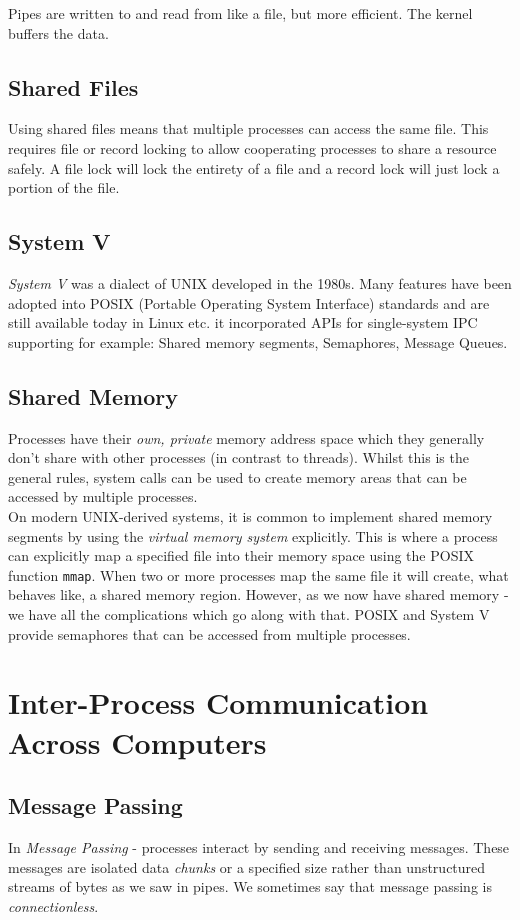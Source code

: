 Pipes are written to and read from like a file, but more efficient. The kernel buffers the data.

\subsection{Shared Files}
Using shared files means that multiple processes can access the same file. This requires file or record locking to allow cooperating processes to share a resource safely. A file lock will lock the entirety of a file and a record lock will just lock a portion of the file.

\subsection{System V}
\textit{System V} was a dialect of UNIX developed in the 1980s. Many features have been adopted into POSIX (Portable Operating System Interface) standards and are still available today in Linux etc. it incorporated APIs for single-system IPC supporting for example: Shared memory segments, Semaphores, Message Queues.

\subsection{Shared Memory}
Processes have their \textit{own, private} memory address space which they generally don't share with other processes (in contrast to threads). Whilst this is the general rules, system calls can be used to create memory areas that can be accessed by multiple processes.\\

On modern UNIX-derived systems, it is common to implement shared memory segments by using the \textit{virtual memory system} explicitly. This is where a process can explicitly map a specified file into their memory space using the POSIX function \verb|mmap|. When two or more processes map the same file it will create, what behaves like, a shared memory region. However, as we now have shared memory - we have all the complications which go along with that. POSIX and System V provide semaphores that can be accessed from multiple processes. 

\section{Inter-Process Communication Across Computers}
\subsection{Message Passing}
In \textit{Message Passing} - processes interact by sending and receiving messages. These messages are isolated data \textit{chunks} or a specified size rather than unstructured streams of bytes as we saw in pipes. We sometimes say that message passing is \textit{connectionless}.\\

